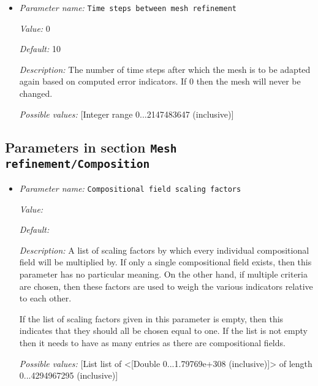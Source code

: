 \begin{itemize}
{\it Possible values:} [MultipleSelection composition|density|nonadiabatic temperature|temperature|thermal energy density|topography|velocity|viscosity ]
\item {\it Parameter name:} {\tt Time steps between mesh refinement}


{\it Value:} 0


{\it Default:} 10


{\it Description:} The number of time steps after which the mesh is to be adapted again based on computed error indicators. If 0 then the mesh will never be changed.


{\it Possible values:} [Integer range 0...2147483647 (inclusive)]
\end{itemize}



\subsection{Parameters in section \tt Mesh refinement/Composition}
\label{parameters:Mesh_20refinement/Composition}

\begin{itemize}
\item {\it Parameter name:} {\tt Compositional field scaling factors}


{\it Value:} 


{\it Default:} 


{\it Description:} A list of scaling factors by which every individual compositional field will be multiplied by. If only a single compositional field exists, then this parameter has no particular meaning. On the other hand, if multiple criteria are chosen, then these factors are used to weigh the various indicators relative to each other. 

If the list of scaling factors given in this parameter is empty, then this indicates that they should all be chosen equal to one. If the list is not empty then it needs to have as many entries as there are compositional fields.


{\it Possible values:} [List list of <[Double 0...1.79769e+308 (inclusive)]> of length 0...4294967295 (inclusive)]
\end{itemize}

